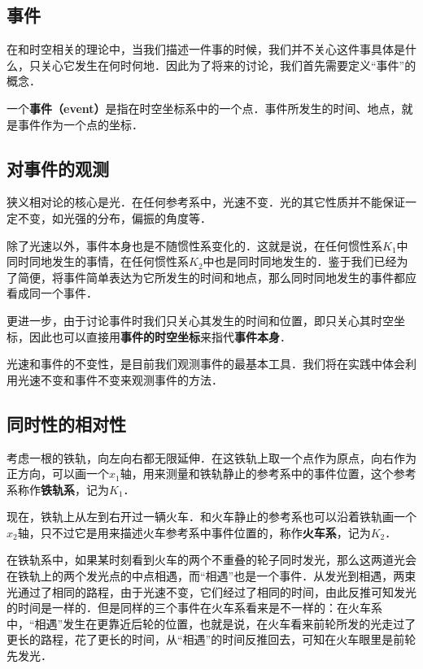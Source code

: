 

\subsection{事件}

在和时空相关的理论中，当我们描述一件事的时候，我们并不关心这件事具体是什么，只关心它发生在何时何地．因此为了将来的讨论，我们首先需要定义“事件”的概念．

一个\textbf{事件（event）}是指在时空坐标系中的一个点．事件所发生的时间、地点，就是事件作为一个点的坐标．

\subsection{对事件的观测}

狭义相对论的核心是光．在任何参考系中，光速不变．光的其它性质并不能保证一定不变，如光强的分布，偏振的角度等．

除了光速以外，事件本身也是不随惯性系变化的．这就是说，在任何惯性系$K_1$中同时同地发生的事情，在任何惯性系$K_2$中也是同时同地发生的．鉴于我们已经为了简便，将事件简单表达为它所发生的时间和地点，那么同时同地发生的事件都应看成同一个事件．

更进一步，由于讨论事件时我们只关心其发生的时间和位置，即只关心其时空坐标，因此也可以直接用\textbf{事件的时空坐标}来指代\textbf{事件本身}．

光速和事件的不变性，是目前我们观测事件的最基本工具．我们将在实践中体会利用光速不变和事件不变来观测事件的方法．

\subsection{同时性的相对性}

考虑一根的铁轨，向左向右都无限延伸．在这铁轨上取一个点作为原点，向右作为正方向，可以画一个$x_1$轴，用来测量和铁轨静止的参考系中的事件位置，这个参考系称作\textbf{铁轨系}，记为$K_1$．

现在，铁轨上从左到右开过一辆火车．和火车静止的参考系也可以沿着铁轨画一个$x_2$轴，只不过它是用来描述火车参考系中事件位置的，称作\textbf{火车系}，记为$K_2$．

在铁轨系中，如果某时刻看到火车的两个不重叠的轮子同时发光，那么这两道光会在铁轨上的两个发光点的中点相遇，而“相遇”也是一个事件．从发光到相遇，两束光通过了相同的路程，由于光速不变，它们经过了相同的时间，由此反推可知发光的时间是一样的．但是同样的三个事件在火车系看来是不一样的：在火车系中，“相遇”发生在更靠近后轮的位置，也就是说，在火车看来前轮所发的光走过了更长的路程，花了更长的时间，从“相遇”的时间反推回去，可知在火车眼里是前轮先发光．

